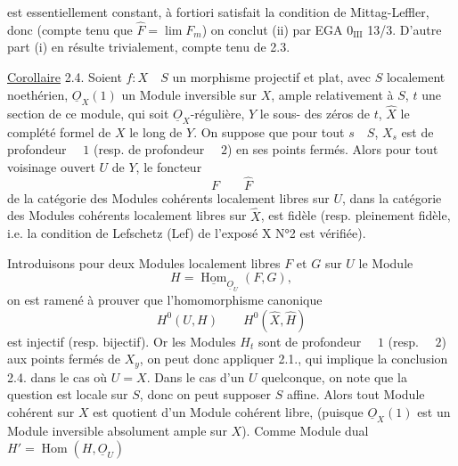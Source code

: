 
est essentiellement constant,  à fortiori satisfait la condition de Mittag-Leffler, donc (compte tenu que $\widehat F=\lim F_m$) on conclut (ii) par EGA $0_{\mathrm{III}}$ 13/3. D'autre part (i) en résulte trivialement, compte tenu de 2.3.

\uline{Corollaire} 2.4. Soient $f:X\quad S$ un morphisme projectif et plat, avec $S$ localement noethérien, $\underline O_X(1)$ un Module inversible sur $X$, ample relativement à $S$, $t$ une section de ce module, qui soit $\underline O_X$-régulière, $Y$  le sous- des zéros de $t$, $\widehat X$ le complété formel de $X$ le long de $Y$. On suppose que pour tout $s\quad S$, $X_s$ est de profondeur $\quad1$ (resp. de profondeur $\quad2$) en ses points fermés. Alors pour tout voisinage ouvert $U$ de $Y$, le foncteur
\[
F\qquad\widehat F
\]
de la catégorie des Modules cohérents localement libres sur $U$, dans la catégorie des Modules cohérents localement libres sur $\widehat X$, est fidèle (resp. pleinement fidèle, i.e. la condition  de Lefschetz (Lef) de l'exposé X N°2 est vérifiée).

Introduisons  pour deux Modules localement libres $F$ et $G$ sur $U$ le Module
\[
H=\underline{\operatorname{Hom}}_{\underline O_U}(F,G),
\]
on est ramené à prouver que l'homomorphisme canonique
\[
H^0(U,H)\qquad H^0(\widehat X,\widehat H)
\]
est injectif (resp. bijectif). Or les Modules $H_t$ sont de profondeur $\quad1$ (resp. $\quad2$) aux points fermés de $X_y$, on peut donc appliquer 2.1., qui implique la conclusion 2.4. dans le cas où $U=X$. Dans le cas d'un $U$ quelconque, on note que la question est locale sur $S$, donc on peut supposer $S$ affine. Alors tout Module cohérent sur $X$ est quotient d'un Module cohérent  libre, (puisque $\underline O_X(1)$ est un Module inversible absolument ample sur $X$). Comme  Module dual $H'=\operatorname{Hom}(H,\underline O_U)$

